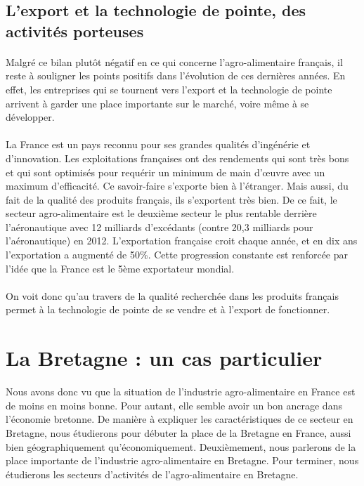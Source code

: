 \documentclass[a4paper,12pt]{report}
\begin{document}
		\subsection{L'export et la technologie de pointe, des activités porteuses}
			\paragraph{}Malgré ce bilan plutôt négatif en ce qui concerne l’agro-alimentaire français, il reste à souligner les points positifs dans l’évolution de ces dernières années. En effet, les entreprises qui se tournent vers l’export et la technologie de pointe arrivent à garder une place importante sur le marché, voire même à se développer.
			
			\paragraph{}La France est un pays reconnu pour ses grandes qualités d’ingénérie et d’innovation. Les exploitations françaises ont des rendements qui sont très bons et qui sont optimisés pour requérir un minimum de main d'œuvre avec un maximum d’efficacité. Ce savoir-faire s’exporte bien à l’étranger. Mais aussi, du fait de la qualité des produits français, ils s’exportent très bien. De ce fait, le secteur agro-alimentaire est le deuxième secteur le plus rentable derrière l’aéronautique avec 12 milliards d’excédants (contre 20,3 milliards pour l’aéronautique) en 2012\cite{AAExport2014}. L’exportation française croit chaque année, et en dix ans l’exportation a augmenté de 50\%. Cette progression constante est renforcée par l’idée que la France est le 5ème exportateur mondial.
			
			\paragraph{}On voit donc qu'au travers de la qualité recherchée dans les produits français permet à la technologie de pointe de se vendre et à l'export de fonctionner.

	\section{La Bretagne : un cas particulier}
	Nous avons donc vu que la situation de l’industrie agro-alimentaire en France est de moins en moins bonne. Pour autant, elle semble avoir un bon ancrage dans l’économie bretonne. De manière à expliquer les caractéristiques de ce secteur en Bretagne, nous étudierons pour débuter la place de la Bretagne en France, aussi bien géographiquement qu’économiquement. Deuxièmement, nous parlerons de la place importante de l’industrie agro-alimentaire en Bretagne. Pour terminer, nous étudierons les secteurs d’activités de l’agro-alimentaire en Bretagne.
	
\end{document}
